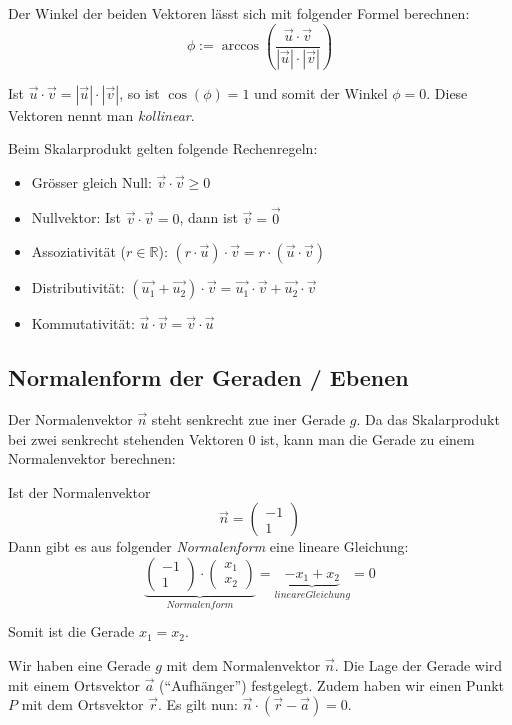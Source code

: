 Der Winkel der beiden Vektoren lässt sich mit folgender Formel
berechnen:
\[ \phi := \arccos{\left(\frac{\vec{u} \cdot \vec{v}}{|\vec{u}| \cdot
|\vec{v}|}\right)} \]

Ist $\vec{u} \cdot \vec{v} = |\vec{u}| \cdot |\vec{v}|$, so ist
$\cos(\phi) = 1$ und somit der Winkel $\phi = 0$. Diese Vektoren nennt
man \emph{kollinear}.

Beim Skalarprodukt gelten folgende Rechenregeln:
\begin{itemize}
  \item Grösser gleich Null: $\vec{v} \cdot \vec{v} \ge 0$
  \item Nullvektor: Ist $\vec{v} \cdot \vec{v} = 0$, dann ist $\vec{v} = \vec{0}$
  \item Assoziativität ($r \in \mathbb{R}$): $(r \cdot \vec{u}) \cdot \vec{v} 
    = r \cdot ( \vec{u} \cdot \vec{v})$
  \item Distributivität: $(\vec{u_1} + \vec{u_2}) \cdot \vec{v} 
    = \vec{u_1} \cdot \vec{v} + \vec{u_2} \cdot \vec{v}$
  \item Kommutativität: $\vec{u} \cdot \vec{v} = \vec{v} \cdot \vec{u}$
\end{itemize}

\subsection{Normalenform der Geraden / Ebenen}
Der Normalenvektor $\vec{n}$ steht senkrecht zue iner Gerade $g$. Da das
Skalarprodukt bei zwei senkrecht stehenden Vektoren $0$ ist, kann man
die Gerade zu einem Normalenvektor berechnen:

Ist der Normalenvektor
\[ \vec{n} = \left( \begin{array}{r} -1 \\ 1 \end{array} \right) \]
Dann gibt es aus folgender \emph{Normalenform} eine lineare
Gleichung:
\[ \underbrace{\left( \begin{array}{r} -1 \\ 1 \end{array} \right) \cdot
  \left( \begin{array}{r} x_1 \\ x_2 \end{array} \right)}_{Normalenform}
  = \underbrace{-x_1 + x_2}_{lineare Gleichung} = 0 \]

Somit ist die Gerade $x_1 = x_2$.

Wir haben eine Gerade $g$ mit dem Normalenvektor $\vec{n}$. Die Lage der Gerade
wird mit einem Ortsvektor $\vec{a}$ ("`Aufhänger"') festgelegt. Zudem
haben wir einen Punkt $P$ mit dem Ortsvektor $\vec{r}$. Es gilt nun: $\vec{n}
\cdot (\vec{r} - \vec{a}) = 0$.

